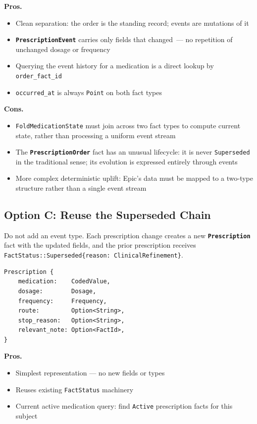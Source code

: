 \documentclass[11pt]{article}
\newcommand{\entity}[1]{\texttt{\textbf{#1}}}
\newcommand{\field}[1]{\texttt{#1}}
\newenvironment{prosbox}{%
  \begin{mdframed}[backgroundcolor=notegreen,
    linecolor=noteborder, linewidth=1pt,
    innertopmargin=8pt, innerbottommargin=8pt,
    innerleftmargin=10pt, innerrightmargin=10pt]
  \small
}{%
  \end{mdframed}
}
\newenvironment{consbox}{%
  \begin{mdframed}[backgroundcolor=warningyellow,
    linecolor=warningborder, linewidth=1pt,
    innertopmargin=8pt, innerbottommargin=8pt,
    innerleftmargin=10pt, innerrightmargin=10pt]
  \small
}{%
  \end{mdframed}
}
\begin{document}
\begin{prosbox}
\textbf{Pros.}
\begin{itemize}[noitemsep]
  \item Clean separation: the order is the standing record; events are
    mutations of it
  \item \entity{PrescriptionEvent} carries only fields that changed~---
    no repetition of unchanged dosage or frequency
  \item Querying the event history for a medication is a direct lookup
    by \field{order\_fact\_id}
  \item \field{occurred\_at} is always \field{Point} on both fact types
\end{itemize}
\end{prosbox}

\begin{consbox}
\textbf{Cons.}
\begin{itemize}[noitemsep]
  \item \field{FoldMedicationState} must join across two fact types to
    compute current state, rather than processing a uniform event stream
  \item The \entity{PrescriptionOrder} fact has an unusual lifecycle:
    it is never \field{Superseded} in the traditional sense; its
    evolution is expressed entirely through events
  \item More complex deterministic uplift: Epic's data must be mapped
    to a two-type structure rather than a single event stream
\end{itemize}
\end{consbox}

\subsection{Option C: Reuse the Superseded Chain}
\label{sec:option-c}

Do not add an event type. Each prescription change creates a new
\entity{Prescription} fact with the updated fields, and the prior
prescription receives \field{FactStatus::Superseded\{reason:
ClinicalRefinement\}}.

\begin{lstlisting}
Prescription {
    medication:    CodedValue,
    dosage:        Dosage,
    frequency:     Frequency,
    route:         Option<String>,
    stop_reason:   Option<String>,
    relevant_note: Option<FactId>,
}
\end{lstlisting}

\begin{prosbox}
\textbf{Pros.}
\begin{itemize}[noitemsep]
  \item Simplest representation --- no new fields or types
  \item Reuses existing \field{FactStatus} machinery
  \item Current active medication query: find \field{Active}
    prescription facts for this subject
\end{itemize}
\end{prosbox}
\end{document}
